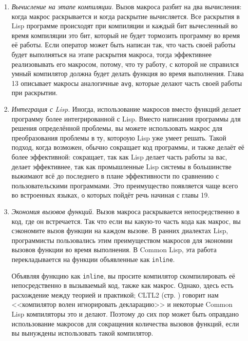 \documentclass[12pt, a4paper]{article} %
\begin{document}
\begin{enumerate}
    \item \textit{Вычисление на этапе компиляции}. Вызов макроса разбит на два вычисления: когда макрос раскрывается и когда раскрытие вычисляется. Все раскрытия в Lisp программе происходят при компиляции и каждый бит вычесленный во время компиляции это бит, который не будет тормозить программу во время её работы. Если оператор может быть написан так, что часть своей работы будет выполняться на этапе раскрытия макроса, тогда эффективнее реализовывать его макросом, потому, что ту работу, с которой не справился умный компилятор должна будет делать функция во время выполнения. Глава 13 описывает макросы аналогичные \texttt{avg}, которые делают часть своей работы при раскрытии.

    \item \textit{Интеграция с Lisp.} Иногда, использование макросов вместо функций делает программу более интегрированной с Lisp. Вместо написания программы для решения определённой проблемы, вы можете использовать макрос для преобразования проблемы в ту, котороую Lisp уже умеет решать. Такой подход, когда возможен, обычно сокращает код программы, и также делаёт её более эффективной: сокращает, так как Lisp делает часть работы за вас, делает эффективнее, так как промышленные Lisp системы в большинстве выжимают всё до последнего в плане эффективности по сравнению с пользовательскими программами. Это преимущество появляется чаще всего во встроенных языках, о которых пойдёт речь начиная с главы 19.
    
    \item \textit{Экономия вызовов функций}. Вызов макроса раскрывается непосредственно в код, где он встречается. Так что если вы какую-то часть кода как макрос, вы сэкономите вызов функции на каждом вызове. В ранних диалектах Lisp, программисты пользовались этим преимуществом макросов для экономии вызовов функции во время выполнения. В Common Lisp, эта работа перекладывается на функции объявленные как \texttt{inline}.

    Объявляя функцию как \texttt{inline}, вы просите компилятор скомпилировать её непосредственно в вызываемый код, также как макрос. Однако, здесь есть расхождение между теорией и практикой; \textsc{CLTL2} (стр. \pageref{229}) говорит нам <<компилятор волен игнорировать декларацию>> и некоторые Common Lisp компиляторы это и делают. Поэтому до сих пор может быть оправдано использование макросов для сокращения количества вызовов функций, если вы вынуждены использовать такой компилятор.
\end{enumerate}
\end{document}
